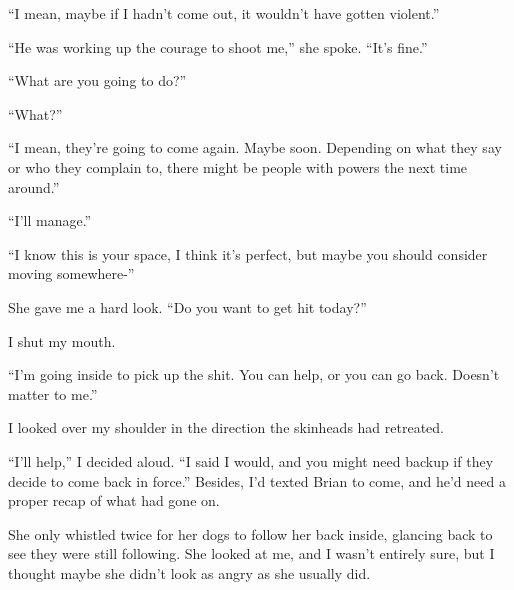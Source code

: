 ``I mean, maybe if I hadn't come out, it wouldn't have gotten violent.''



``He was working up the courage to shoot me,'' she spoke.  ``It's fine.''



``What are you going to do?''



``What?''



``I mean, they're going to come again.  Maybe soon.  Depending on what they say or who they complain to, there might be people with powers the next time around.''



``I'll manage.''



``I know this is your space, I think it's perfect, but maybe you should consider moving somewhere-''



She gave me a hard look.  ``Do you want to get hit today?''



I shut my mouth.



``I'm going inside to pick up the shit.  You can help, or you can go back.  Doesn't matter to me.''



I looked over my shoulder in the direction the skinheads had retreated.



``I'll help,'' I decided aloud. ``I said I would, and you might need backup if they decide to come back in force.''  Besides, I'd texted Brian to come, and he'd need a proper recap of what had gone on.



She only whistled twice for her dogs to follow her back inside, glancing back to see they were still following.  She looked at me, and I wasn't entirely sure, but I thought maybe she didn't look as angry as she usually did.





